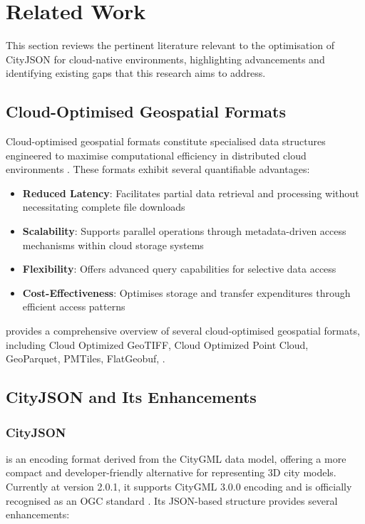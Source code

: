 
\chapter{Related Work}
\label{rw:related_work}
This section reviews the pertinent literature relevant to the optimisation of CityJSON for cloud-native environments, highlighting advancements and identifying existing gaps that this research aims to address.

\section{Cloud-Optimised Geospatial Formats}
\label{rw:cloud_optimised_formats}
Cloud-optimised geospatial formats constitute specialised data structures engineered to maximise computational efficiency in distributed cloud environments \citep{cloud-optimised-formats}. These formats exhibit several quantifiable advantages:

\begin{itemize}
  \item \textbf{Reduced Latency}: Facilitates partial data retrieval and processing without necessitating complete file downloads
  \item \textbf{Scalability}: Supports parallel operations through metadata-driven access mechanisms within cloud storage systems
  \item \textbf{Flexibility}: Offers advanced query capabilities for selective data access
  \item \textbf{Cost-Effectiveness}: Optimises storage and transfer expenditures through efficient access patterns
\end{itemize}

\citet{cloud-optimised-formats} provides a comprehensive overview of several cloud-optimised geospatial formats, including Cloud Optimized GeoTIFF, Cloud Optimized Point Cloud, GeoParquet, PMTiles, FlatGeobuf, \etc.

\section{CityJSON and Its Enhancements}
\label{rw:cityjson_enhancements}
\subsection{CityJSON}
\label{rw:cityjson_enhancements:cityjson}
\citet{cityjson} is an encoding format derived from the CityGML \citep{CityGML} data model, offering a more compact and developer-friendly alternative for representing 3D city models. Currently at version 2.0.1, it supports CityGML 3.0.0 encoding and is officially recognised as an OGC standard \citep{ogc}. Its JSON-based structure provides several enhancements:

